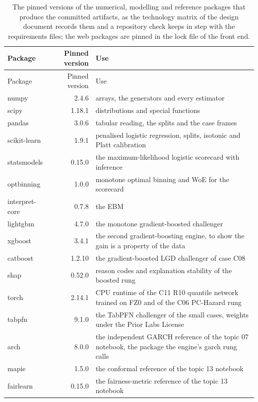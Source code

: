{\footnotesize
\setlength{\tabcolsep}{3pt}
\renewcommand{\arraystretch}{1.12}
\begin{longtable}{lr>{\raggedright\arraybackslash}p{9.0cm}}
\caption{The pinned versions of the numerical, modelling and reference packages that produce the committed artifacts, as the technology matrix of the design document records them and a repository check keeps in step with the requirements files; the web packages are pinned in the lock file of the front end.}\label{tab:repro-versions}\\
\toprule
Package & Pinned version & Use \\
\midrule
\endfirsthead
\toprule
Package & Pinned version & Use \\
\midrule
\endhead
\bottomrule
\endfoot
numpy & 2.4.6 & arrays, the generators and every estimator \\
scipy & 1.18.1 & distributions and special functions \\
pandas & 3.0.6 & tabular reading, the splits and the case frames \\
scikit-learn & 1.9.1 & penalised logistic regression, splits, isotonic and Platt calibration \\
statsmodels & 0.15.0 & the maximum-likelihood logistic scorecard with inference \\
optbinning & 1.0.0 & monotone optimal binning and WoE for the scorecard \\
interpret-core & 0.7.8 & the EBM \\
lightgbm & 4.7.0 & the monotone gradient-boosted challenger \\
xgboost & 3.4.1 & the second gradient-boosting engine, to show the gain is a property of the data \\
catboost & 1.2.10 & the gradient-boosted LGD challenger of case C08 \\
shap & 0.52.0 & reason codes and explanation stability of the boosted rung \\
torch & 2.14.1 & CPU runtime of the C11 R10 quantile network trained on FZ0 and of the C06 PC-Hazard rung \\
tabpfn & 9.1.0 & the TabPFN challenger of the small cases, weights under the Prior Labs License \\
arch & 8.0.0 & the independent GARCH reference of the topic 07 notebook, the package the engine's garch rung calls \\
mapie & 1.5.0 & the conformal reference of the topic 13 notebook \\
fairlearn & 0.15.0 & the fairness-metric reference of the topic 13 notebook \\

\end{longtable}}
